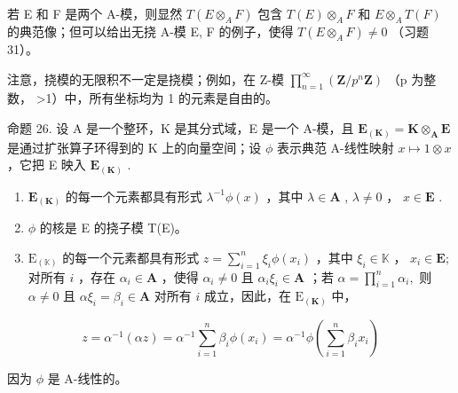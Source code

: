 若 E 和 F 是两个 A-模，则显然 \(T(E \otimes_{A} F)\) 包含 \(T(E) \otimes_{A} F\) 和 \(E \otimes_{A} T(F)\) 的典范像；但可以给出无挠 A-模 E, F 的例子，使得 \(T(E \otimes_{A} F) \neq 0\) （习题 31）。

注意，挠模的无限积不一定是挠模；例如，在 Z-模 \(\prod_{n=1}^{\infty}\left(\mathbf{Z}/p^{n}\mathbf{Z}\right)\) （p 为整数， \textgreater1）中，所有坐标均为 1 的元素是自由的。

命题 26. 设 A 是一个整环，K 是其分式域，E 是一个 A-模，且 \(\mathbf{E}_{(\mathbf{K})} = \mathbf{K} \otimes_{\mathbf{A}} \mathbf{E}\) 是通过扩张算子环得到的 K 上的向量空间；设 \(\phi\) 表示典范 A-线性映射 \(x \mapsto 1 \otimes x\) ，它把 E 映入 \(\mathbf{E}_{(\mathbf{K})}\) .

\begin{enumerate}
\def\labelenumi{(\roman{enumi})}
\item
  \(\mathbf{E}_{(\mathbf{K})}\) 的每一个元素都具有形式 \(\lambda^{-1}\phi(x)\) ，其中 \(\lambda \in \mathbf{A}\) , \(\lambda \neq 0\) ， \(x \in \mathbf{E}\) .
\item
  \(\phi\) 的核是 E 的挠子模 T(E)。
\item
  \(\mathrm{E}_{(\mathbb{K})}\) 的每一个元素都具有形式 \(z = \sum_{i=1}^{n} \xi_i \phi(x_i)\) ，其中 \(\xi_i \in \mathbb{K}\) ， \(x_{i}\in \mathbf{E};\) 对所有 \(i\) ，存在 \(\alpha_{i}\in \mathbf{A}\) ，使得 \(\alpha_{i}\neq 0\) 且 \(\alpha_{i}\xi_{i}\in \mathbf{A}\) ；若 \(\alpha = \prod_{i = 1}^{n}\alpha_{i},\) 则 \(\alpha \neq 0\) 且 \(\alpha \xi_{i} = \beta_{i}\in \mathbf{A}\) 对所有 \(i\) 成立，因此，在 \(\mathrm{E}_{(\mathbf{K})}\) 中，
\end{enumerate}

\[
z = \alpha^ {- 1} (\alpha z) = \alpha^ {- 1} \sum_ {i = 1} ^ {n} \beta_ {i} \phi (x _ {i}) = \alpha^ {- 1} \phi \left(\sum_ {i = 1} ^ {n} \beta_ {i} x _ {i}\right)
\]

因为 \(\phi\) 是 A-线性的。

